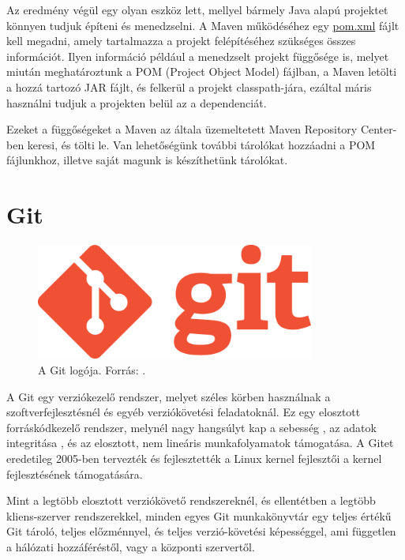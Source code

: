 \documentclass[a4paper,12pt]{report}
\begin{document}
Az eredmény végül egy olyan eszköz lett, mellyel bármely Java alapú projektet könnyen tudjuk építeni és menedzselni. A Maven működéséhez egy \url{pom.xml} fájlt kell megadni, amely tartalmazza a projekt felépítéséhez szükséges összes információt. Ilyen információ például a menedzselt projekt függősége is, melyet miután meghatároztunk a POM (Project Object Model) fájlban, a Maven letölti a hozzá tartozó JAR fájlt, és felkerül a projekt classpath-jára, ezáltal máris használni tudjuk a projekten belül az a dependenciát.

\vspace{2mm}
Ezeket a függőségeket a Maven az általa üzemeltetett Maven Repository Center-ben \cite{mavenrepository} keresi, és tölti le. Van lehetőségünk további tárolókat hozzáadni a POM fájlunkhoz, illetve saját magunk is készíthetünk tárolókat.

\newpage
\section{Git}
\label{git}

\begin{figure}[ht]
\centerline{
\includegraphics[width=3.6in]{img/gitlogo}}
\caption{A Git logója. Forrás: \cite{gitlogo}.}
\label{gitlogo}
\end{figure}

A Git egy verziókezelő rendszer, melyet széles körben használnak a szoftverfejlesztésnél és egyéb verziókövetési feladatoknál. Ez egy elosztott forráskódkezelő rendszer, melynél nagy hangsúlyt kap a sebesség \cite{gitspeed}, az adatok integritása \cite{gitdata}, és az elosztott, nem lineáris munkafolyamatok támogatása. A Gitet eredetileg 2005-ben tervezték és fejlesztették a Linux kernel fejlesztői a kernel fejlesztésének támogatására.

\vspace{2mm}
Mint a legtöbb elosztott verziókövető rendszereknél, és ellentétben a legtöbb kliens-szerver rendszerekkel, minden egyes Git munkakönyvtár egy teljes értékű Git tároló, teljes előzménnyel, és teljes verzió-követési képességgel, ami független a hálózati hozzáféréstől, vagy a központi szervertől.
\end{document}

